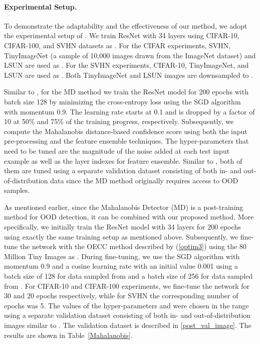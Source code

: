 \documentclass{article} \usepackage{iclr2020_conference,times}
\begin{document}
\paragraph{Experimental Setup.}\label{section_4_2_2}
To demonstrate the adaptability and the effectiveness of our method, we adopt the experimental setup of \citet{Lee:2018:SUF:3327757.3327819}. We train ResNet \citep{DBLP:journals/corr/HeZRS15} with 34 layers using CIFAR-10, CIFAR-100, and SVHN datasets as . For the CIFAR experiments, SVHN, TinyImageNet (a sample of 10,000 images drawn from the ImageNet dataset) and LSUN are used as . For the SVHN experiments, CIFAR-10, TinyImageNet, and LSUN are used as . Both TinyImageNet and LSUN images are downsampled to . 

Similar to \citet{Lee:2018:SUF:3327757.3327819}, for the MD method we train the ResNet model for 200 epochs with batch size 128 by minimizing the cross-entropy loss using the SGD algorithm with momentum 0.9. The learning rate starts at 0.1 and is dropped by a factor of 10 at 50\% and 75\% of the training progress, respectively. Subsequently, we compute the Mahalanobis distance-based confidence score using both the input pre-processing and the feature ensemble techniques. The hyper-parameters that need to be tuned are the magnitude of the noise added at each test input example as well as the layer indexes for feature ensemble. Similar to \citet{Lee:2018:SUF:3327757.3327819}, both of them are tuned using a separate validation dataset consisting of both in- and out-of-distribution data since the MD method originally requires access to OOD samples. 

As mentioned earlier, since the Mahalanobis Detector (MD) is a post-training method for OOD detection, it can be combined with our proposed method. More specifically, we initially train the ResNet model with 34 layers for 200 epochs using exactly the same training setup as mentioned above. Subsequently, we fine-tune the network with the OECC method described by (\ref{optim3}) using the 80 Million Tiny Images as . During fine-tuning, we use the SGD algorithm with momentum 0.9 and a cosine learning rate \citep{loshchilov-ICLR17SGDR} with an initial value 0.001 using a batch size of 128 for data sampled from  and a batch size of 256 for data sampled from . For CIFAR-10 and CIFAR-100 experiments, we fine-tune the network for 30 and 20 epochs respectively, while for SVHN the corresponding number of epochs was 5. The values of the hyper-parameters  and  were chosen in the range  using a separate validation dataset consisting of both in- and out-of-distribution images similar to \citet{Lee:2018:SUF:3327757.3327819}. The validation dataset is described in \ref{post_val_image}. The results are shown in Table~\ref{Mahalanobis}.
\end{document}
